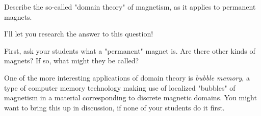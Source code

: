 

Describe the so-called "domain theory" of magnetism, as it applies to permanent magnets.







I'll let you research the answer to this question!







First, ask your students what a "permanent" magnet is.  Are there other kinds of magnets?  If so, what might they be called?

One of the more interesting applications of domain theory is {\it bubble memory}, a type of computer memory technology making use of localized "bubbles" of magnetism in a material corresponding to discrete magnetic domains.  You might want to bring this up in discussion, if none of your students do it first.




